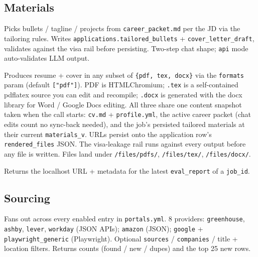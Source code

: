 \documentclass[11pt,letterpaper]{article}
\newcommand{\tool}[1]{\texttt{#1}}
\newcommand{\fpath}[1]{\texttt{#1}}
\begin{document}
\subsection*{Materials}

\begin{description}[leftmargin=0pt]
\item[\tool{generate\_materials}] Picks bullets / tagline / projects from \fpath{career\_packet.md} per the JD via the tailoring rules. Writes \texttt{applications.tailored\_bullets} + \texttt{cover\_letter\_draft}, validates against the visa rail before persisting. Two-step chat shape; \texttt{api} mode auto-validates LLM output.
\item[\tool{render\_pdf}] Produces resume + cover in any subset of \texttt{\{pdf, tex, docx\}} via the \texttt{formats} param (default \texttt{["pdf"]}). PDF is HTML\textrightarrow{}Chromium; \texttt{.tex} is a self-contained pdflatex source you can edit and recompile; \texttt{.docx} is generated with the docx library for Word / Google Docs editing. All three share one content snapshot taken when the call starts: \fpath{cv.md} + \fpath{profile.yml}, the active career packet (chat edits count \textemdash{} no sync-back needed), and the job's persisted tailored materials at their current \texttt{materials\_v}. URLs persist onto the application row's \texttt{rendered\_files} JSON. The visa-leakage rail runs against every output before any file is written. Files land under \fpath{/files/pdfs/}, \fpath{/files/tex/}, \fpath{/files/docx/}.
\item[\tool{get\_report}] Returns the localhost URL + metadata for the latest \texttt{eval\_report} of a \texttt{job\_id}.
\end{description}

\subsection*{Sourcing}

\begin{description}[leftmargin=0pt]
\item[\tool{scan\_portals}] Fans out across every enabled entry in \fpath{portals.yml}. 8 providers: \tool{greenhouse}, \tool{ashby}, \tool{lever}, \tool{workday} (JSON APIs); \tool{amazon} (JSON); \tool{google} + \tool{playwright\_generic} (Playwright). Optional \texttt{sources} / \texttt{companies} / title + location filters. Returns counts (found / new / dupes) and the top 25 new rows.
\end{description}
\end{document}
